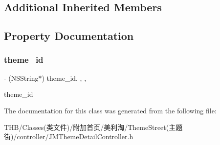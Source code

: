 \subsection*{Additional Inherited Members}


\subsection{Property Documentation}
\mbox{\label{interface_j_m_theme_detail_controller_a9fe2dcc978fd7fe925c6a9b688ed8835}} 
\subsubsection{\texorpdfstring{theme\+\_\+id}{theme\_id}}
{\footnotesize\ttfamily -\/ (N\+S\+String$\ast$) theme\+\_\+id\hspace{0.3cm}{\ttfamily [read]}, {\ttfamily [write]}, {\ttfamily [nonatomic]}, {\ttfamily [copy]}}

theme\+\_\+id 

The documentation for this class was generated from the following file\+:\begin{DoxyCompactItemize}
\item 
T\+H\+B/\+Classes(类文件)/附加首页/美利淘/\+Theme\+Street(主题街)/controller/J\+M\+Theme\+Detail\+Controller.\+h\end{DoxyCompactItemize}
